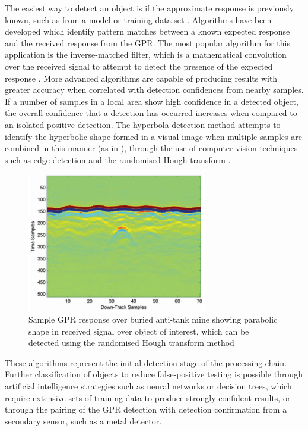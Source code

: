 \documentclass[main.tex]{subfiles}
\begin{document}
The easiest way to detect an object is if the approximate response is previously known, such as from a model or training data set \parencite{Yarovoy2009}. Algorithms have been developed which identify pattern matches between a known expected response and the received response from the GPR. The most popular algorithm for this application is the inverse-matched filter, which is a mathematical convolution over the received signal to attempt to detect the presence of the expected response \parencite{Osumi1984}. More advanced algorithms are capable of producing results with greater accuracy when correlated with detection confidences from nearby samples. If a number of samples in a local area show high confidence in a detected object, the overall confidence that a detection has occurred increases when compared to an isolated positive detection. The hyperbola detection method attempts to identify the hyperbolic shape formed in a visual image when multiple samples are combined in this manner (as in ), through the use of computer vision techniques such as edge detection and the randomised Hough transform \parencite{Xu1990}.
\begin{figure}[ht]
\includegraphics[width=0.7\textwidth]{2-LiteratureReview/GPR-sample.png}
\centering
\caption[Sample GPR response over buried anti-tank mine]{Sample GPR response over buried anti-tank mine showing parabolic shape in received signal over object of interest, which can be detected using the randomised Hough transform method} 
\end{figure}

These algorithms represent the initial detection stage of the processing chain. Further classification of objects to reduce false-positive testing is possible through artificial intelligence strategies such as neural networks or decision trees, which require extensive sets of training data to produce strongly confident results, or through the pairing of the GPR detection with detection confirmation from a secondary sensor, such as a metal detector.
\end{document}
